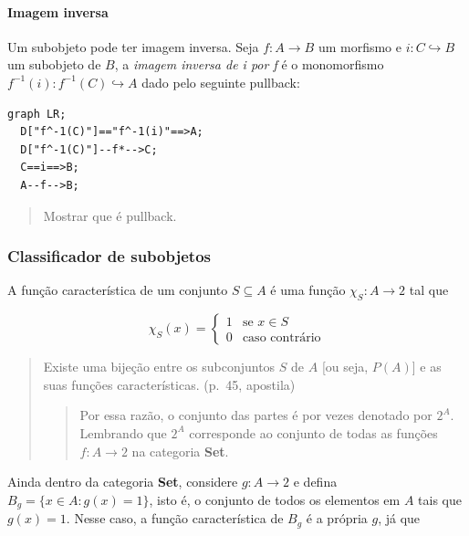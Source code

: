 \hypertarget{imagem-inversa}{%
\paragraph{Imagem inversa}\label{imagem-inversa}}

Um subobjeto pode ter imagem inversa. Seja \(f : A \rightarrow B\) um
morfismo e \(i : C \hookrightarrow B\) um subobjeto de \(B\), a
\emph{imagem inversa de i por f} é o monomorfismo
\(f^{-1}(i) : f^{-1}(C) \hookrightarrow A\) dado pelo seguinte pullback:

\begin{verbatim}
graph LR;
  D["f^-1(C)"]=="f^-1(i)"==>A;
  D["f^-1(C)"]--f*-->C;
  C==i==>B;
  A--f-->B;
\end{verbatim}

\begin{quote}
Mostrar que é pullback.
\end{quote}

\hypertarget{classificador-de-subobjetos}{%
\subsubsection{Classificador de
subobjetos}\label{classificador-de-subobjetos}}

A função característica de um conjunto \(S \subseteq A\) é uma função
\(\chi_S : A \rightarrow 2\) tal que

\[
  \chi_S(x) =
  \begin{cases}
    1 & \text{se $x \in S$} \\
    0 & \text{caso contrário}
  \end{cases}
\]

\begin{quote}
Existe uma bijeção entre os subconjuntos \(S\) de \(A\) {[}ou seja,
\(P(A)\){]} e as suas funções características. (p.~45, apostila)

\begin{quote}
Por essa razão, o conjunto das partes é por vezes denotado por \(2^A\).
Lembrando que \(2^A\) corresponde ao conjunto de todas as funções
\(f : A \rightarrow 2\) na categoria \textbf{Set}.
\end{quote}
\end{quote}

Ainda dentro da categoria \textbf{Set}, considere
\(g : A \rightarrow 2\) e defina \(B_g = \{ x \in A : g(x) = 1 \}\),
isto é, o conjunto de todos os elementos em \(A\) tais que \(g(x) = 1\).
Nesse caso, a função característica de \(B_g\) é a própria \(g\), já que


